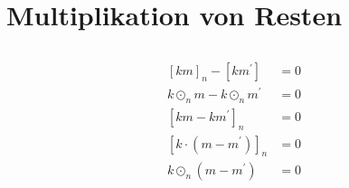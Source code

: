 \documentclass{../crypto}
\date{30. Oktober 2015}
\begin{document}
\maketitle

\section{Multiplikation von Resten}

\subsection{}






\begin{align*}
   \left[km\right]_n - \left[km^\prime\right] & = 0 \\
   k\odot_n m - k \odot_n m^\prime            & = 0 \\
   \left[km - km^\prime\right]_n              & = 0 \\
   \left[k\cdot(m - m^\prime)\right]_n        & = 0 \\
   k \odot_n (m - m^\prime)                   & = 0
\end{align*}
\end{document}
